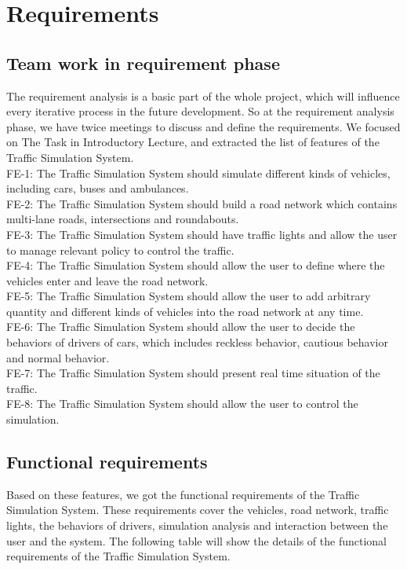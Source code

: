 \documentclass[a4paper,12pt]{article}
\begin{document}
\section{Requirements}
\subsection{Team work in requirement phase} The requirement analysis is a basic part of the whole project, which will influence every iterative process in the future development. So at the requirement analysis phase, we have twice meetings to discuss and define the requirements. We focused on The Task in Introductory Lecture, and extracted the list of features of the Traffic Simulation System. \\
FE-1: The Traffic Simulation System should simulate different kinds of vehicles, including cars, buses and ambulances.\\
FE-2: The Traffic Simulation System should build a road network which contains multi-lane roads, intersections and roundabouts.\\
FE-3: The Traffic Simulation System should have traffic lights and allow the user to manage relevant policy to control the traffic.\\
FE-4: The Traffic Simulation System should allow the user to define where the vehicles enter and leave the road network.\\
FE-5: The Traffic Simulation System should allow the user to add arbitrary quantity and different kinds of vehicles into the road network at any time.\\
FE-6: The Traffic Simulation System should allow the user to decide the behaviors of drivers of cars, which includes reckless behavior, cautious behavior and normal behavior.\\
FE-7: The Traffic Simulation System should present real time situation of the traffic.\\
FE-8: The Traffic Simulation System should allow the user to control the simulation.\\

\subsection{Functional requirements}  Based on these features, we got the functional requirements of the Traffic Simulation System. These requirements cover the vehicles, road network, traffic lights, the behaviors of drivers, simulation analysis and interaction between the user and the system. The following table will show the details of the functional requirements of the Traffic Simulation System.
\end{document}
